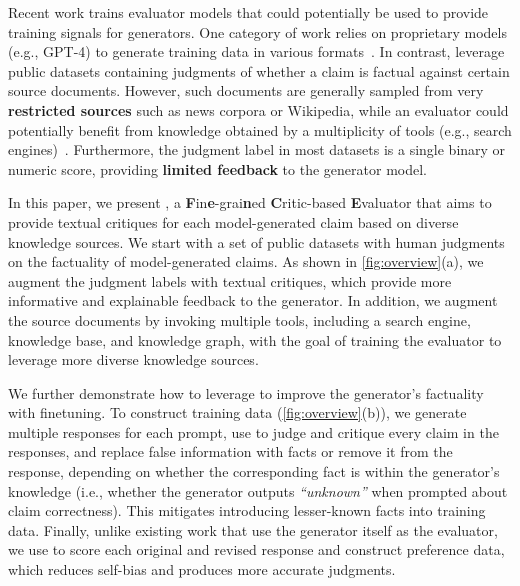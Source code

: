 Recent work trains evaluator models that could potentially be used to provide training signals for generators.
One category of work relies on proprietary models (e.g., GPT-4) to generate training data in various formats~\citep{prometheus,AutoJ}.
In contrast, \citet{FLAMe} leverage public datasets containing judgments of whether a claim is factual against certain source documents. 
However, such documents are generally sampled from very \textbf{restricted sources} such as news corpora or Wikipedia, while an evaluator could potentially benefit from knowledge obtained by a multiplicity of tools (e.g., search engines)~\citep{longform}.
Furthermore, the judgment label in most datasets is a single binary or numeric score, providing \textbf{limited feedback} to the generator model.

In this paper, we present \fencemodelname, a \textbf{F}in\textbf{e}-grai\textbf{n}ed \textbf{C}ritic-based \textbf{E}valuator that aims to provide textual critiques for each model-generated claim based on diverse knowledge sources.
We start with a set of public datasets with human judgments on the factuality of model-generated claims. 
As shown in \autoref{fig:overview}(a), we augment the judgment labels with textual critiques, which provide more informative and explainable feedback to the generator.
In addition, we augment the source documents by invoking multiple tools, including a search engine, knowledge base, and knowledge graph, with the goal of training the evaluator to leverage more diverse knowledge sources.

We further demonstrate how to leverage \fencemodelname to improve the generator's factuality with finetuning.
To construct training data (\autoref{fig:overview}(b)), we generate multiple responses for each prompt, use \fencemodelname to judge and critique every claim in the responses, and replace false information with facts or remove it from the response, depending on whether the corresponding fact is within the generator's knowledge 
(i.e., whether the generator outputs \textit{``unknown''} when prompted about claim correctness). 
This mitigates introducing lesser-known facts into training data.
Finally, unlike existing work that use the generator itself as the evaluator, we use \fencemodelname to score each original and revised response and construct preference data, which reduces self-bias and produces more accurate judgments.


